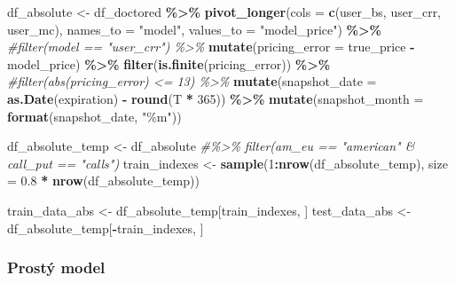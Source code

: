 \documentclass[
]{article}
\newenvironment{Shaded}{\begin{snugshade}}{\end{snugshade}}
\newcommand{\AttributeTok}[1]{\textcolor[rgb]{0.13,0.29,0.53}{#1}}
\newcommand{\CommentTok}[1]{\textcolor[rgb]{0.56,0.35,0.01}{\textit{#1}}}
\newcommand{\DecValTok}[1]{\textcolor[rgb]{0.00,0.00,0.81}{#1}}
\newcommand{\FloatTok}[1]{\textcolor[rgb]{0.00,0.00,0.81}{#1}}
\newcommand{\FunctionTok}[1]{\textcolor[rgb]{0.13,0.29,0.53}{\textbf{#1}}}
\newcommand{\NormalTok}[1]{#1}
\newcommand{\OtherTok}[1]{\textcolor[rgb]{0.56,0.35,0.01}{#1}}
\newcommand{\SpecialCharTok}[1]{\textcolor[rgb]{0.81,0.36,0.00}{\textbf{#1}}}
\newcommand{\StringTok}[1]{\textcolor[rgb]{0.31,0.60,0.02}{#1}}
\begin{document}
\begin{Shaded}
\begin{Highlighting}[]
\NormalTok{df\_absolute }\OtherTok{\textless{}{-}}\NormalTok{ df\_doctored }\SpecialCharTok{\%\textgreater{}\%}
  \FunctionTok{pivot\_longer}\NormalTok{(}\AttributeTok{cols =} \FunctionTok{c}\NormalTok{(user\_bs, user\_crr, user\_mc),}
               \AttributeTok{names\_to =} \StringTok{"model"}\NormalTok{,}
               \AttributeTok{values\_to =} \StringTok{"model\_price"}\NormalTok{) }\SpecialCharTok{\%\textgreater{}\%}
  \CommentTok{\#filter(model == "user\_crr") \%\textgreater{}\%}
  \FunctionTok{mutate}\NormalTok{(}\AttributeTok{pricing\_error =}\NormalTok{ true\_price }\SpecialCharTok{{-}}\NormalTok{ model\_price) }\SpecialCharTok{\%\textgreater{}\%}
  \FunctionTok{filter}\NormalTok{(}\FunctionTok{is.finite}\NormalTok{(pricing\_error)) }\SpecialCharTok{\%\textgreater{}\%}
  \CommentTok{\#filter(abs(pricing\_error) \textless{}= 13) \%\textgreater{}\%}
  \FunctionTok{mutate}\NormalTok{(}\AttributeTok{snapshot\_date =} \FunctionTok{as.Date}\NormalTok{(expiration) }\SpecialCharTok{{-}} \FunctionTok{round}\NormalTok{(T }\SpecialCharTok{*} \DecValTok{365}\NormalTok{)) }\SpecialCharTok{\%\textgreater{}\%}
  \FunctionTok{mutate}\NormalTok{(}\AttributeTok{snapshot\_month =} \FunctionTok{format}\NormalTok{(snapshot\_date, }\StringTok{"\%m"}\NormalTok{))}
\end{Highlighting}
\end{Shaded}

\begin{Shaded}
\begin{Highlighting}[]
\NormalTok{df\_absolute\_temp }\OtherTok{\textless{}{-}}\NormalTok{ df\_absolute }\CommentTok{\#\%\textgreater{}\% filter(am\_eu == "american" \& call\_put == "calls")}
\NormalTok{train\_indexes }\OtherTok{\textless{}{-}} \FunctionTok{sample}\NormalTok{(}\DecValTok{1}\SpecialCharTok{:}\FunctionTok{nrow}\NormalTok{(df\_absolute\_temp), }\AttributeTok{size =} \FloatTok{0.8} \SpecialCharTok{*} \FunctionTok{nrow}\NormalTok{(df\_absolute\_temp))}

\NormalTok{train\_data\_abs }\OtherTok{\textless{}{-}}\NormalTok{ df\_absolute\_temp[train\_indexes, ]}
\NormalTok{test\_data\_abs }\OtherTok{\textless{}{-}}\NormalTok{ df\_absolute\_temp[}\SpecialCharTok{{-}}\NormalTok{train\_indexes, ]}
\end{Highlighting}
\end{Shaded}

\subsubsection{Prostý model}\label{prostuxfd-model}
\end{document}
